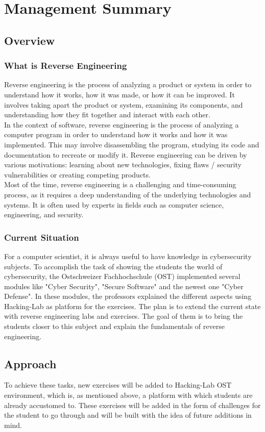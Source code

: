\chapter{Management Summary}
\section{Overview}
\subsection{What is Reverse Engineering}
Reverse engineering is the process of analyzing a product or system in order to understand how it works, how it was made, or how it can be improved. It involves taking apart the product or system, examining its components, and understanding how they fit together and interact with each other. \\
In the context of software, reverse engineering is the process of analyzing a computer program in order to understand how it works and how it was implemented. This may involve disassembling the program, studying its code and documentation to recreate or modify it. Reverse engineering can be driven by various motivations: learning about new technologies, fixing flaws / security vulnerabilities or creating competing products. \\  
Most of the time, reverse engineering is a challenging and time-consuming process, as it requires a deep understanding of the underlying technologies and systems. It is often used by experts in fields such as computer science, engineering, and security. 

\subsection{Current Situation}
For a computer scientist, it is always useful to have knowledge in cybersecurity subjects. To accomplish the task of showing the students the world of cybersecurity, the Ostschweizer Fachhochschule (OST) implemented several modules like "Cyber Security", "Secure Software" and the newest one "Cyber Defense". In these modules, the professors explained the different aspects using Hacking-Lab as platform for the exercises. The plan is to extend the current state with reverse engineering labs and exercises. The goal of them is to bring the students closer to this subject and explain the fundamentals of reverse engineering.

\section{Approach}
To achieve these tasks, new exercises will be added to Hacking-Lab OST environment, which is, as mentioned above, a platform with which students are already accustomed to. These exercises will be added in the form of challenges for the student to go through and will be built with the idea of future additions in mind.

